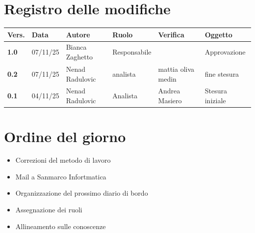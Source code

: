 \documentclass[a4paper,12pt]{article}
\begin{document}


\newpage
\section*{Registro delle modifiche}

\begin{table}[h!]
    \begin{tabularx}{\textwidth}{|l|l|l|l|X|X|}
        \hline
        \textbf{Vers.} & \textbf{Data} & \textbf{Autore} & \textbf{Ruolo} & \textbf{Verifica} & \textbf{Oggetto} \\
        \hline
        \textbf{1.0} & 07/11/25 & Bianca Zaghetto & Responsabile & & Approvazione \\
        \hline
        \textbf{0.2} & 07/11/25 & Nenad Radulovic & analista & mattia oliva medin & fine stesura \\
        \hline
        \textbf{0.1} & 04/11/25 & Nenad Radulovic & Analista & Andrea Masiero & Stesura iniziale \\
       \hline
    \end{tabularx}
\end{table}

\newpage
\tableofcontents
\newpage

\section{Ordine del giorno}
\begin{itemize}
    \item Correzioni del metodo di lavoro
    \item Mail a Sanmarco Infortmatica
    \item Organizzazione del prossimo diario di bordo
    \item Assegnazione dei ruoli
    \item Allineamento sulle conoscenze
\end{itemize}
\end{document}

